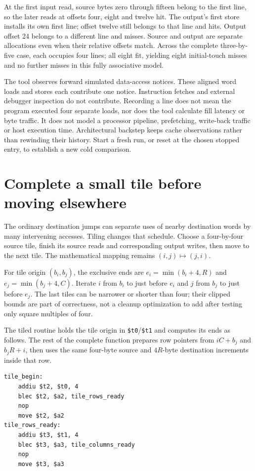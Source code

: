 At the first input read, source bytes zero through fifteen belong to the first
line, so the later reads at offsets four, eight and twelve hit. The output's first
store installs its own first line; offset twelve still belongs to that line and
hits. Output offset 24 belongs to a different line and misses. Source and output
are separate allocations even when their relative offsets match. Across the
complete three-by-five case, each occupies four lines; all eight fit, yielding
eight initial-touch misses and no further misses in this fully associative model.

The tool observes forward simulated data-access notices. These aligned word loads
and stores each contribute one notice. Instruction fetches and external debugger
inspection do not contribute. Recording a line does not mean the program executed
four separate loads, nor does the tool calculate fill latency or byte traffic.
It does not model a processor pipeline, prefetching, write-back traffic or host
execution time. Architectural backstep keeps cache observations rather than
rewinding their history. Start a fresh run, or reset at the chosen stopped entry,
to establish a new cold comparison.

\section{Complete a small tile before moving elsewhere}

The ordinary destination jumps can separate uses of nearby destination words by
many intervening accesses. Tiling changes that schedule. Choose a four-by-four
source tile, finish its source reads and corresponding output writes, then move
to the next tile. The mathematical mapping remains $(i,j)\mapsto(j,i)$.

For tile origin $(b_i,b_j)$, the exclusive ends are
$e_i=\min(b_i+4,R)$ and $e_j=\min(b_j+4,C)$. Iterate $i$ from $b_i$ to just before
$e_i$ and $j$ from $b_j$ to just before $e_j$. The last tiles can be narrower or
shorter than four; their clipped bounds are part of correctness, not a cleanup
optimization to add after testing only square multiples of four.

The tiled routine holds the tile origin in \texttt{\$t0}/\texttt{\$t1} and
computes its ends as follows. The rest of the complete function prepares row
pointers from $iC+b_j$ and $b_jR+i$, then uses the same four-byte source and
$4R$-byte destination increments inside that row.

\noindent\begin{minipage}{\linewidth}
  \begin{verbatim}
tile_begin:
    addiu $t2, $t0, 4
    blec $t2, $a2, tile_rows_ready
    nop
    move $t2, $a2
tile_rows_ready:
    addiu $t3, $t1, 4
    blec $t3, $a3, tile_columns_ready
    nop
    move $t3, $a3
\end{verbatim}
\end{minipage}

